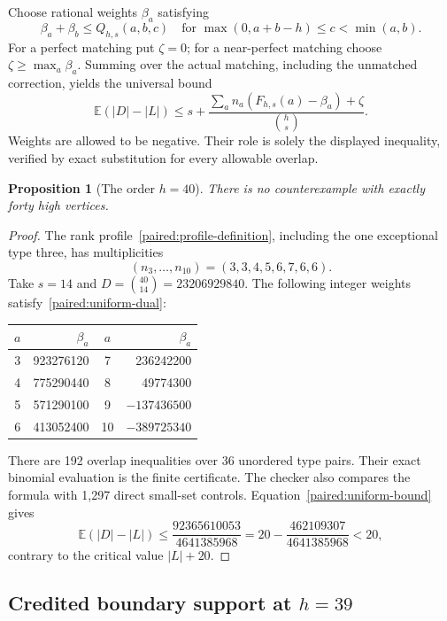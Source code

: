 \documentclass[11pt,a4paper]{article}
\newtheorem{proposition}[theorem]{Proposition}
\theoremstyle{definition}\newtheorem{definition}[theorem]{Definition}
\theoremstyle{remark}\newtheorem{remark}[theorem]{Remark}
\begin{document}
Choose rational weights $\beta_a$ satisfying
\begin{equation}\label{paired:uniform-dual}
 \beta_a+\beta_b\le Q_{h,s}(a,b,c)
 \quad\text{for }\max(0,a+b-h)\le c<\min(a,b).
\end{equation}
For a perfect matching put $\zeta=0$; for a near-perfect matching
choose $\zeta\ge\max_a\beta_a$. Summing over the actual matching,
including the unmatched correction, yields the universal bound
\begin{equation}\label{paired:uniform-bound}
 \mathbb E(|D|-|L|)\le s+
 \frac{\sum_a n_a(F_{h,s}(a)-\beta_a)+\zeta}{\binom hs}.
\end{equation}
Weights are allowed to be negative. Their role is solely the displayed
inequality, verified by exact substitution for every allowable overlap.

\begin{proposition}[The order $h=40$]\label{paired:h40}
There is no counterexample with exactly forty high vertices.
\end{proposition}
\begin{proof}
The rank profile~\eqref{paired:profile-definition}, including the one
exceptional type three, has multiplicities
\[
 (n_3,\ldots,n_{10})=(3,3,4,5,6,7,6,6).
\]
Take $s=14$ and $D=\binom{40}{14}=23206929840$. The following integer
weights satisfy~\eqref{paired:uniform-dual}:
\begin{center}\small
\begin{tabular}{cr@{\qquad}cr}
\toprule
$a$&$\beta_a$&$a$&$\beta_a$\\\midrule
3&923276120&7&236242200\\
4&775290440&8&49774300\\
5&571290100&9&$-137436500$\\
6&413052400&10&$-389725340$\\\bottomrule
\end{tabular}
\end{center}
There are 192 overlap inequalities over 36 unordered type pairs.
Their exact binomial evaluation is the finite certificate. The checker
also compares the formula with 1,297 direct small-set controls.
Equation~\eqref{paired:uniform-bound} gives
\[
 \mathbb E(|D|-|L|)\le\frac{92365610053}{4641385968}
 =20-\frac{462109307}{4641385968}<20,
\]
contrary to the critical value $|L|+20$.
\end{proof}

\subsection{Credited boundary support at \texorpdfstring{$h=39$}{h=39}}
\label{paired:h39-section}
\end{document}
